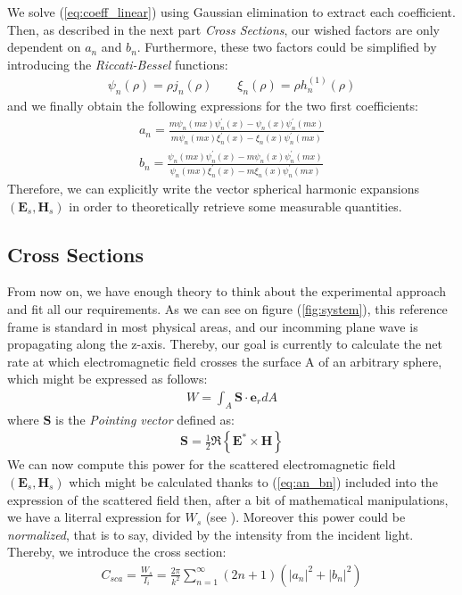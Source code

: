 \documentclass{article}
\numberwithin{equation}{section}
\begin{document}
We solve (\ref{eq:coeff_linear}) using Gaussian elimination to extract each coefficient. Then, as described in the next part \textit{Cross Sections}, our wished factors are only dependent on $a_{n}$ and $b_{n}$. Furthermore, these two factors could be simplified by introducing the \textit{Riccati-Bessel} functions:
\begin{align}
\psi_{n}(\rho)=\rho j_{n}(\rho) \qquad \xi_{n}(\rho)=\rho h^{(1)}_{n}(\rho)
\end{align}
and we finally obtain the following expressions for the two first coefficients:
\begin{equation}\label{eq:an_bn}
\begin{aligned}
a_{n} = \frac{m\psi_{n}(mx)\psi^{'}_{n}(x)-\psi_{n}(x)\psi^{'}_{n}(mx)}{m\psi_{n}(mx)\xi^{'}_{n}(x)-\xi_{n}(x)\psi^{'}_{n}(mx)}\\
b_{n} = \frac{\psi_{n}(mx)\psi^{'}_{n}(x)-m\psi_{n}(x)\psi^{'}_{n}(mx)}{\psi_{n}(mx)\xi^{'}_{n}(x)-m\xi_{n}(x)\psi^{'}_{n}(mx)}
\end{aligned}
\end{equation}
Therefore, we can explicitly write the vector spherical harmonic expansions $(\textbf{E}_{s}, \textbf{H}_{s})$ in order to theoretically retrieve some measurable quantities.

\subsection{Cross Sections}

From now on, we have enough theory to think about the experimental approach and fit all our requirements. As we can see on figure (\ref{fig:system}), this reference frame is standard in most physical areas, and our incomming plane wave is propagating along the z-axis. Thereby, our goal is currently to calculate the net rate at which electromagnetic field crosses the surface A of an arbitrary sphere, which might be expressed as follows:
\begin{align}\label{eq:power_def}
W=\int_{A}^{}\textbf{S}\cdot \textbf{e}_{r}dA
\end{align}
where $\textbf{S}$ is the \textit{Pointing vector} defined as:
\begin{align}
\textbf{S} = \frac{1}{2}\Re\left\{\textbf{E}^{*} \times \textbf{H}\right\}
\end{align}
We can now compute this power for the scattered electromagnetic field $(\textbf{E}_{s}, \textbf{H}_{s})$ which might be calculated thanks to (\ref{eq:an_bn}) included into the expression of the scattered field then, after a bit of mathematical manipulations, we have a literral expression for $W_{s}$ (see \cite{craigdonald}). Moreover this power could be \textit{normalized}, that is to say, divided by the intensity from the incident light. Thereby, we introduce the cross section:
\begin{align}\label{eq:csca}
C_{sca}=\frac{W_{s}}{I_{i}}=\frac{2\pi}{k^{2}}\sum_{n=1}^{\infty }(2n+1)(\left| a_{n} \right|^{2}+\left| b_{n} \right|^{2})
\end{align}
\end{document}
